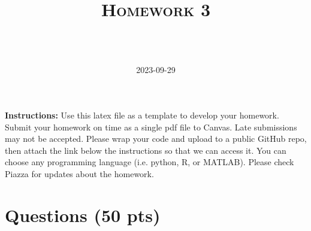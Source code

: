 \documentclass[a4paper]{article}
\title{\textsc{Homework 3}} %
\author{
\red{Nick Boddy} \\
\red{nboddy}\\
}
\date{2023-09-29}
\theoremstyle{definition}
\begin{document}
\maketitle 


\textbf{Instructions:} 
Use this latex file as a template to develop your homework. Submit your homework on time as a single pdf file to Canvas. Late submissions may not be accepted. Please wrap your code and upload to a public GitHub repo, then attach the link below the instructions so that we can access it. You can choose any programming language (i.e. python, R, or MATLAB). Please check Piazza for updates about the homework.

\section{Questions (50 pts)}
\end{document}
